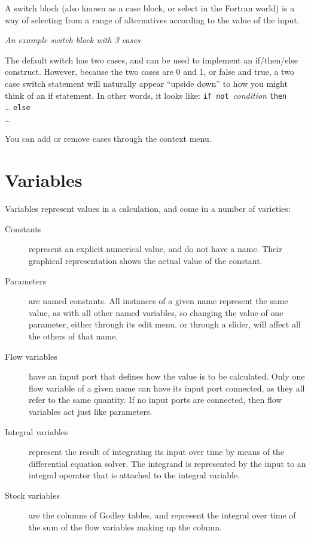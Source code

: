 A switch block (also known as a case block, or select in the Fortran
world) is a way of selecting from a range of alternatives according
to the value of the input.

\begin{center}
{\em An example switch block with 3 cases}
\end{center}

The default switch has two cases, and can be used to implement an
if/then/else construct. However, because the two cases are 0 and 1,
or false and true, a two case switch statement will naturally appear
``upside down'' to how you might think of an if statement. In other
words, it looks like:
{\tt if not }{\em condition} {\tt then}\\
 \ldots
{\tt else}\\
\ldots

You can add or remove cases through the context menu. 

\section{Variables}

Variables represent values in a calculation, and come in a number of
varieties:
\begin{description}
\item[Constants] represent an explicit numerical value, and do not
have a name. Their graphical representation shows the actual value of
the constant.
\item[Parameters] are named constants. All instances of a given name
represent the same value, as with all other named variables, so
changing the value of one parameter, either through its edit menu, or
through a slider, will affect all the others of that name.
\item[Flow variables] have an input port that defines how the value is
to be calculated. Only one flow variable of a given name can have its
input port connected, as they all refer to the same quantity. If no
input ports are connected, then flow variables act just like
parameters.
\item[Integral variables] represent the result of integrating its
input over time  by means of the differential
equation solver. The integrand is represented by the input to an
integral operator that is attached to the integral variable.
\item[Stock variables] are the columns of Godley tables, and represent
the integral over time of the sum of the flow variables making up the
column.
\end{description}

